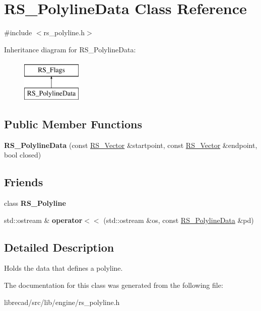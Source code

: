 \hypertarget{classRS__PolylineData}{\section{R\-S\-\_\-\-Polyline\-Data Class Reference}
\label{classRS__PolylineData}
}


{\ttfamily \#include $<$rs\-\_\-polyline.\-h$>$}

Inheritance diagram for R\-S\-\_\-\-Polyline\-Data\-:\begin{figure}[H]
\begin{center}
\leavevmode
\includegraphics[height=2.000000cm]{classRS__PolylineData}
\end{center}
\end{figure}
\subsection*{Public Member Functions}
\begin{DoxyCompactItemize}
\item 
\hypertarget{classRS__PolylineData_a98113d6dfb7a56d33a1ecc9278b66c1e}{{\bfseries R\-S\-\_\-\-Polyline\-Data} (const \hyperlink{classRS__Vector}{R\-S\-\_\-\-Vector} \&startpoint, const \hyperlink{classRS__Vector}{R\-S\-\_\-\-Vector} \&endpoint, bool closed)}\label{classRS__PolylineData_a98113d6dfb7a56d33a1ecc9278b66c1e}

\end{DoxyCompactItemize}
\subsection*{Friends}
\begin{DoxyCompactItemize}
\item 
\hypertarget{classRS__PolylineData_ab78676d1e4e1a92bb36728a67e48d9b8}{class {\bfseries R\-S\-\_\-\-Polyline}}\label{classRS__PolylineData_ab78676d1e4e1a92bb36728a67e48d9b8}

\item 
\hypertarget{classRS__PolylineData_a986544442b918fc992501f1be22570db}{std\-::ostream \& {\bfseries operator$<$$<$} (std\-::ostream \&os, const \hyperlink{classRS__PolylineData}{R\-S\-\_\-\-Polyline\-Data} \&pd)}\label{classRS__PolylineData_a986544442b918fc992501f1be22570db}

\end{DoxyCompactItemize}


\subsection{Detailed Description}
Holds the data that defines a polyline. 

The documentation for this class was generated from the following file\-:\begin{DoxyCompactItemize}
\item 
librecad/src/lib/engine/rs\-\_\-polyline.\-h\end{DoxyCompactItemize}
